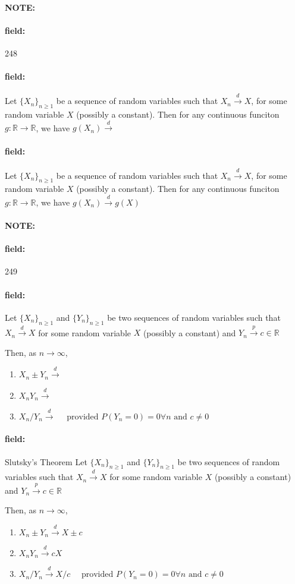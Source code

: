 \documentclass[12pt]{article}
\newenvironment{note}{\paragraph{NOTE:}}{}
\newenvironment{field}{\paragraph{field:}}{}
\begin{document}
\begin{note} \begin{field} \tiny 248 \end{field}
  \begin{field}
    Let $\{X_n\}_{n \geq 1}$ be a sequence of random variables such that $X_n \overset{d}{\to}X$, for some random variable $X$ (possibly a constant). Then for any continuous funciton $g:\mathbb{R} \to \mathbb{R}$, we have $g(X_n) \overset{d}{\to} $
  \end{field}
  \begin{field}
    Let $\{X_n\}_{n \geq 1}$ be a sequence of random variables such that $X_n \overset{d}{\to}X$, for some random variable $X$ (possibly a constant). Then for any continuous funciton $g:\mathbb{R} \to \mathbb{R}$, we have $g(X_n) \overset{d}{\to} g(X)$
  \end{field}
\end{note}

\begin{note} \begin{field} \tiny 249 \end{field}
  \begin{field}
    Let $\{X_n\}_{n \geq 1}$ and $\{Y_n\}_{n \geq 1}$ be two sequences of random variables such that $X_n \overset{d}{\to}X$ for some random variable $X$ (possibly a constant) and $Y_n \overset{p}{\to} c \in \mathbb{R}$

    Then, as $n \to \infty$,

    \begin{enumerate}
      \item $X_n \pm Y_n \overset{d}{\to} $
      \item $X_nY_n \overset{d}{\to} $
      \item $X_n/Y_n \overset{d}{\to} \quad \text{ provided } P(Y_n = 0) = 0 \forall n \text{ and } c \neq 0$
    \end{enumerate}
  \end{field}
  \begin{field}
    Slutsky's Theorem
    Let $\{X_n\}_{n \geq 1}$ and $\{Y_n\}_{n \geq 1}$ be two sequences of random variables such that $X_n \overset{d}{\to}X$ for some random variable $X$ (possibly a constant) and $Y_n \overset{p}{\to} c \in \mathbb{R}$

    Then, as $n \to \infty$,

    \begin{enumerate}
      \item $X_n \pm Y_n \overset{d}{\to} X \pm c$
      \item $X_nY_n \overset{d}{\to} cX$
      \item $X_n/Y_n \overset{d}{\to} X/c \quad \text{ provided } P(Y_n = 0) = 0 \forall n \text{ and } c \neq 0$
    \end{enumerate}
  \end{field}
\end{note}
\end{document}
